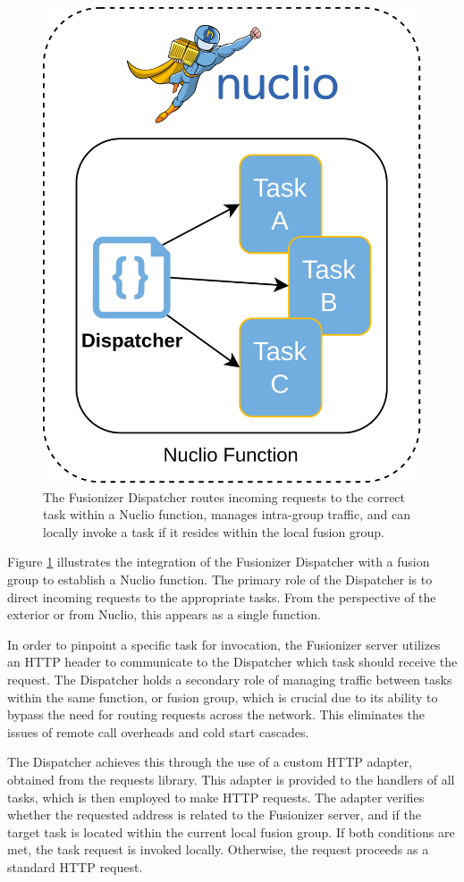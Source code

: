\begin{figure}
    \centering
    \includegraphics[width=.5\linewidth]{figures/fusionizer_dispatcher}
    \caption{
        The Fusionizer Dispatcher routes incoming requests to the correct task
        within a Nuclio function, manages intra-group traffic, and can locally
        invoke a task if it resides within the local fusion group.
    }
    \label{fig:fusionizer_dispatcher}
\end{figure}

Figure \ref{fig:fusionizer_dispatcher} illustrates the integration of the
Fusionizer Dispatcher with a fusion group to establish a Nuclio function. The
primary role of the Dispatcher is to direct incoming requests to the appropriate
tasks. From the perspective of the exterior or from Nuclio, this appears as a
single function.

In order to pinpoint a specific task for invocation, the Fusionizer server
utilizes an HTTP header to communicate to the Dispatcher which task should
receive the request. The Dispatcher holds a secondary role of managing traffic
between tasks within the same function, or fusion group, which is crucial due to
its ability to bypass the need for routing requests across the network. This
eliminates the issues of remote call overheads and cold start cascades.

The Dispatcher achieves this through the use of a custom HTTP adapter, obtained
from the requests library. This adapter is provided to the handlers of all
tasks, which is then employed to make HTTP requests. The adapter verifies
whether the requested address is related to the Fusionizer server, and if the
target task is located within the current local fusion group. If both conditions
are met, the task request is invoked locally. Otherwise, the request proceeds as
a standard HTTP request.

